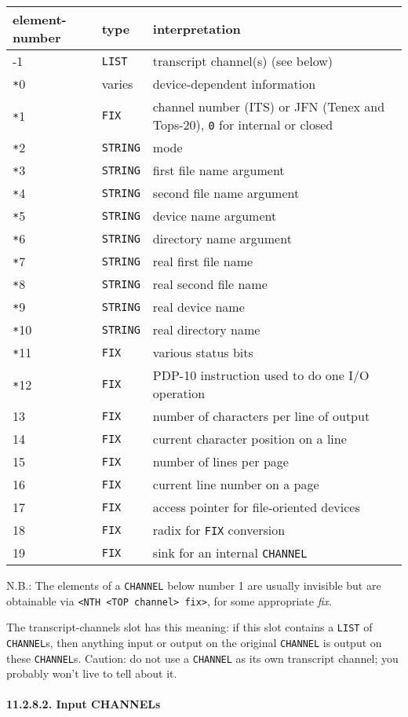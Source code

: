 \documentclass[a4paper,]{article}
\let\oldparagraph\paragraph
\renewcommand{\paragraph}[1]{\oldparagraph{#1}\mbox{}}
\begin{document}
\begin{longtable}[]{@{}lll@{}}
\toprule
element-number & type & interpretation\tabularnewline
\midrule
\endhead
-1 & \texttt{LIST} & transcript channel(s) (see below)\tabularnewline
\texttt{*}0 & varies & device-dependent information\tabularnewline
\texttt{*}1 & \texttt{FIX} & channel number (ITS) or JFN (Tenex and Tops-20), \texttt{0} for internal or
closed\tabularnewline
\texttt{*}2 & \texttt{STRING} & mode\tabularnewline
\texttt{*}3 & \texttt{STRING} & first file name argument\tabularnewline
\texttt{*}4 & \texttt{STRING} & second file name argument\tabularnewline
\texttt{*}5 & \texttt{STRING} & device name argument\tabularnewline
\texttt{*}6 & \texttt{STRING} & directory name argument\tabularnewline
\texttt{*}7 & \texttt{STRING} & real first file name\tabularnewline
\texttt{*}8 & \texttt{STRING} & real second file name\tabularnewline
\texttt{*}9 & \texttt{STRING} & real device name\tabularnewline
\texttt{*}10 & \texttt{STRING} & real directory name\tabularnewline
\texttt{*}11 & \texttt{FIX} & various status bits\tabularnewline
\texttt{*}12 & \texttt{FIX} & PDP-10 instruction used to do one I/O operation\tabularnewline
13 & \texttt{FIX} & number of characters per line of output\tabularnewline
14 & \texttt{FIX} & current character position on a line\tabularnewline
15 & \texttt{FIX} & number of lines per page\tabularnewline
16 & \texttt{FIX} & current line number on a page\tabularnewline
17 & \texttt{FIX} & access pointer for file-oriented devices\tabularnewline
18 & \texttt{FIX} & radix for \texttt{FIX} conversion\tabularnewline
19 & \texttt{FIX} & sink for an internal \texttt{CHANNEL}\tabularnewline
\bottomrule
\end{longtable}

N.B.: The elements of a \texttt{CHANNEL} below number 1 are usually invisible but are obtainable via
\texttt{\textless{}NTH\ \textless{}TOP\ channel\textgreater{}\ fix\textgreater{}}, for some appropriate \emph{fix}.

The transcript-channels slot has this meaning: if this slot contains a \texttt{LIST} of \texttt{CHANNEL}s, then anything
input or output on the original \texttt{CHANNEL} is output on these \texttt{CHANNEL}s. Caution: do not use a
\texttt{CHANNEL} as its own transcript channel; you probably won't live to tell about it.

\paragraph{11.2.8.2. Input CHANNELs}\label{input-channels}
\end{document}
